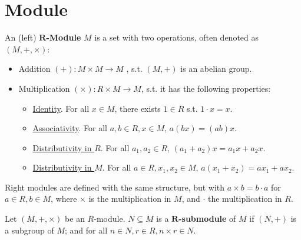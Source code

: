 \documentclass{article}
\begin{document}

\tableofcontents
\newpage

\def\Ann{\mathrm{Ann}}
\def\Supp{\mathrm{Supp}}

\section{Module}

\begin{definition}[$R$-Module]
    An (left) \textbf{$\bm{R}$-Module} $M$ is a set with two operations, often denoted as $(M, +, \times)$:
    \begin{itemize}
        \item Addition $(+): M\times M \to M$ , s.t. $(M, +)$ is an abelian group.
        \item Multiplication $(\times): R\times M \to M$, s.t. it has the following properties:
            \begin{itemize}
                \item \underline{Identity}. For all $x\in M$, there exists $1\in R$ s.t. $1\cdot x = x$.
                \item \underline{Associativity}. For all $a, b\in R, x\in M$, $a(bx) = (ab)x$.
                \item \underline{Distributivity in $R$}. For all $a_1, a_2\in R$, $(a_1 + a_2)x = a_1 x + a_2 x$.
                \item \underline{Distributivity in $M$}. For all $a\in R, x_1, x_2\in M$, $a(x_1 + x_2) = a x_1 + a x_2$.
            \end{itemize}
    \end{itemize}
    Right modules are defined with the same structure, but with $a\times b = b\cdot a$ for $a\in R, b\in M$, where $\times$ is the multiplication in $M$, and $\cdot$ the multiplication in $R$.
\end{definition}

\begin{definition}[Submodule]
    Let $(M, +, \times)$ be an $R$-module. $N \subseteq M$ is a \textbf{$\bm{R}$-submodule} of $M$ if $(N, +)$ is a subgroup of $M$; and for all $n\in N, r\in R, n\times r\in N$.
\end{definition}
\end{document}
